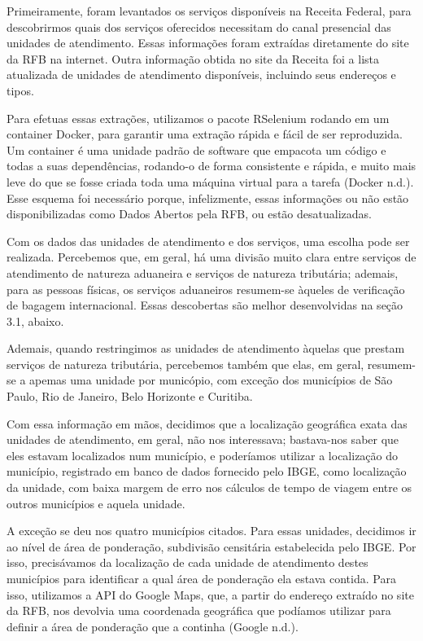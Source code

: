 \documentclass[]{article}
\begin{document}
Primeiramente, foram levantados os serviços disponíveis na Receita
Federal, para descobrirmos quais dos serviços oferecidos necessitam do
canal presencial das unidades de atendimento. Essas informações foram
extraídas diretamente do site da RFB na internet. Outra informação
obtida no site da Receita foi a lista atualizada de unidades de
atendimento disponíveis, incluindo seus endereços e tipos.

Para efetuas essas extrações, utilizamos o pacote RSelenium rodando em
um container Docker, para garantir uma extração rápida e fácil de ser
reproduzida. Um container é uma unidade padrão de software que empacota
um código e todas a suas dependências, rodando-o de forma consistente e
rápida, e muito mais leve do que se fosse criada toda uma máquina
virtual para a tarefa (Docker n.d.). Esse esquema foi necessário porque,
infelizmente, essas informações ou não estão disponibilizadas como Dados
Abertos pela RFB, ou estão desatualizadas.

Com os dados das unidades de atendimento e dos serviços, uma escolha
pode ser realizada. Percebemos que, em geral, há uma divisão muito clara
entre serviços de atendimento de natureza aduaneira e serviços de
natureza tributária; ademais, para as pessoas físicas, os serviços
aduaneiros resumem-se àqueles de verificação de bagagem internacional.
Essas descobertas são melhor desenvolvidas na seção 3.1, abaixo.

Ademais, quando restringimos as unidades de atendimento àquelas que
prestam serviços de natureza tributária, percebemos também que elas, em
geral, resumem-se a apemas uma unidade por municópio, com exceção dos
municípios de São Paulo, Rio de Janeiro, Belo Horizonte e Curitiba.

Com essa informação em mãos, decidimos que a localização geográfica
exata das unidades de atendimento, em geral, não nos interessava;
bastava-nos saber que eles estavam localizados num município, e
poderíamos utilizar a localização do município, registrado em banco de
dados fornecido pelo IBGE, como localização da unidade, com baixa margem
de erro nos cálculos de tempo de viagem entre os outros municípios e
aquela unidade.

A exceção se deu nos quatro municípios citados. Para essas unidades,
decidimos ir ao nível de área de ponderação, subdivisão censitária
estabelecida pelo IBGE. Por isso, precisávamos da localização de cada
unidade de atendimento destes municípios para identificar a qual área de
ponderação ela estava contida. Para isso, utilizamos a API do Google
Maps, que, a partir do endereço extraído no site da RFB, nos devolvia
uma coordenada geográfica que podíamos utilizar para definir a área de
ponderação que a continha (Google n.d.).
\end{document}
